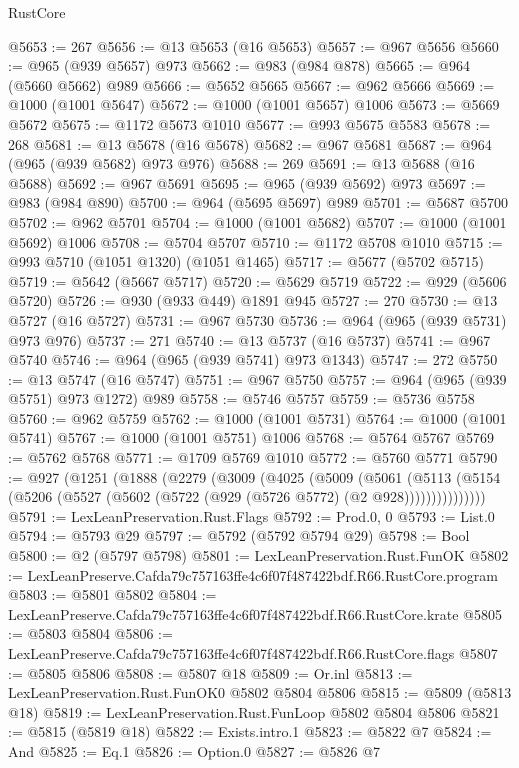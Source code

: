 \begin{lexlean}{RustCore}
\begin{coremodule}
@5653 := 267
@5656 := @13 @5653 (@16 @5653)
@5657 := @967 @5656
@5660 := @965 (@939 @5657) @973
@5662 := @983 (@984 @878)
@5665 := @964 (@5660 @5662) @989
@5666 := @5652 @5665
@5667 := @962 @5666
@5669 := @1000 (@1001 @5647)
@5672 := @1000 (@1001 @5657) @1006
@5673 := @5669 @5672
@5675 := @1172 @5673 @1010
@5677 := @993 @5675 @5583
@5678 := 268
@5681 := @13 @5678 (@16 @5678)
@5682 := @967 @5681
@5687 := @964 (@965 (@939 @5682) @973 @976)
@5688 := 269
@5691 := @13 @5688 (@16 @5688)
@5692 := @967 @5691
@5695 := @965 (@939 @5692) @973
@5697 := @983 (@984 @890)
@5700 := @964 (@5695 @5697) @989
@5701 := @5687 @5700
@5702 := @962 @5701
@5704 := @1000 (@1001 @5682)
@5707 := @1000 (@1001 @5692) @1006
@5708 := @5704 @5707
@5710 := @1172 @5708 @1010
@5715 := @993 @5710 (@1051 @1320) (@1051 @1465)
@5717 := @5677 (@5702 @5715)
@5719 := @5642 (@5667 @5717)
@5720 := @5629 @5719
@5722 := @929 (@5606 @5720)
@5726 := @930 (@933 @449) @1891 @945
@5727 := 270
@5730 := @13 @5727 (@16 @5727)
@5731 := @967 @5730
@5736 := @964 (@965 (@939 @5731) @973 @976)
@5737 := 271
@5740 := @13 @5737 (@16 @5737)
@5741 := @967 @5740
@5746 := @964 (@965 (@939 @5741) @973 @1343)
@5747 := 272
@5750 := @13 @5747 (@16 @5747)
@5751 := @967 @5750
@5757 := @964 (@965 (@939 @5751) @973 @1272) @989
@5758 := @5746 @5757
@5759 := @5736 @5758
@5760 := @962 @5759
@5762 := @1000 (@1001 @5731)
@5764 := @1000 (@1001 @5741)
@5767 := @1000 (@1001 @5751) @1006
@5768 := @5764 @5767
@5769 := @5762 @5768
@5771 := @1709 @5769 @1010
@5772 := @5760 @5771
@5790 := @927
    (@1251
      (@1888
        (@2279
          (@3009
            (@4025
              (@5009
                (@5061
                  (@5113
                    (@5154 (@5206 (@5527 (@5602 (@5722 (@929 (@5726 @5772) (@2 @928)))))))))))))))
@5791 := LexLeanPreservation.Rust.Flags
@5792 := Prod.{0, 0}
@5793 := List.{0}
@5794 := @5793 @29
@5797 := @5792 (@5792 @5794 @29)
@5798 := Bool
@5800 := @2 (@5797 @5798)
@5801 := LexLeanPreservation.Rust.FunOK
@5802 := LexLeanPreserve.Cafda79c757163ffe4c6f07f487422bdf.R66.RustCore.program
@5803 := @5801 @5802
@5804 := LexLeanPreserve.Cafda79c757163ffe4c6f07f487422bdf.R66.RustCore.krate
@5805 := @5803 @5804
@5806 := LexLeanPreserve.Cafda79c757163ffe4c6f07f487422bdf.R66.RustCore.flags
@5807 := @5805 @5806
@5808 := @5807 @18
@5809 := Or.inl
@5813 := LexLeanPreservation.Rust.FunOK0 @5802 @5804 @5806
@5815 := @5809 (@5813 @18)
@5819 := LexLeanPreservation.Rust.FunLoop @5802 @5804 @5806
@5821 := @5815 (@5819 @18)
@5822 := Exists.intro.{1}
@5823 := @5822 @7
@5824 := And
@5825 := Eq.{1}
@5826 := Option.{0}
@5827 := @5826 @7

\end{coremodule}
\end{lexlean}
